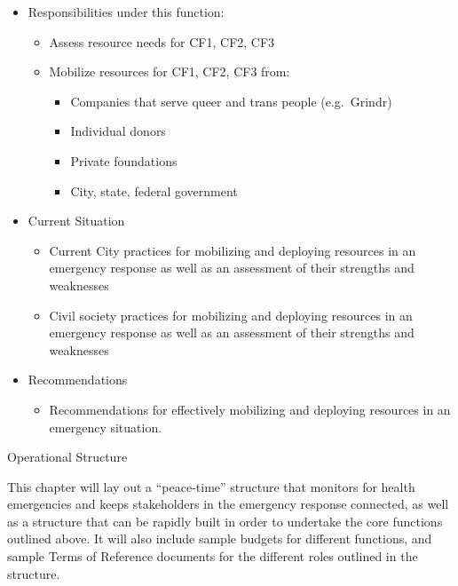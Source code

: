 \documentclass[
  letterpaper,
  DIV=11,
  numbers=noendperiod,
  oneside]{scrreprt}
\providecommand{\tightlist}{%
  \setlength{\itemsep}{0pt}\setlength{\parskip}{0pt}}\usepackage{longtable,booktabs,array}
\begin{document}
\begin{itemize}
\item
  Responsibilities under this function:

  \begin{itemize}
  \item
    Assess resource needs for CF1, CF2, CF3
  \item
    Mobilize resources for CF1, CF2, CF3 from:

    \begin{itemize}
    \item
      Companies that serve queer and trans people (e.g.~Grindr)
    \item
      Individual donors
    \item
      Private foundations
    \item
      City, state, federal government
    \end{itemize}
  \end{itemize}
\item
  Current Situation

  \begin{itemize}
  \item
    Current City practices for mobilizing and deploying resources in an
    emergency response as well as an assessment of their strengths and
    weaknesses
  \item
    Civil society practices for mobilizing and deploying resources in an
    emergency response as well as an assessment of their strengths and
    weaknesses
  \end{itemize}
\item
  Recommendations

  \begin{itemize}
  \tightlist
  \item
    Recommendations for effectively mobilizing and deploying resources
    in an emergency situation.
  \end{itemize}
\end{itemize}

\hfill\break

Operational Structure

\hfill\break

This chapter will lay out a ``peace-time'' structure that monitors for
health emergencies and keeps stakeholders in the emergency response
connected, as well as a structure that can be rapidly built in order to
undertake the core functions outlined above. It will also include sample
budgets for different functions, and sample Terms of Reference documents
for the different roles outlined in the structure.~
\end{document}
